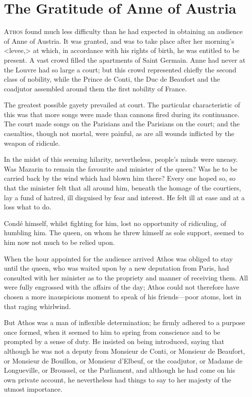 \chapter{The Gratitude of Anne of Austria}

 \lettrine{A}{thos} found much less difficulty than he had expected in obtaining an audience of Anne of Austria. It was granted, and was to take place after her morning's <levee,> at which, in accordance with his rights of birth, he was entitled to be present. A vast crowd filled the apartments of Saint Germain. Anne had never at the Louvre had so large a court; but this crowd represented chiefly the second class of nobility, while the Prince de Conti, the Duc de Beaufort and the coadjutor assembled around them the first nobility of France.

The greatest possible gayety prevailed at court. The particular characteristic of this was that more songs were made than cannons fired during its continuance. The court made songs on the Parisians and the Parisians on the court; and the casualties, though not mortal, were painful, as are all wounds inflicted by the weapon of ridicule.

In the midst of this seeming hilarity, nevertheless, people's minds were uneasy. Was Mazarin to remain the favourite and minister of the queen? Was he to be carried back by the wind which had blown him there? Every one hoped so, so that the minister felt that all around him, beneath the homage of the courtiers, lay a fund of hatred, ill disguised by fear and interest. He felt ill at ease and at a loss what to do.

Condé himself, whilst fighting for him, lost no opportunity of ridiculing, of humbling him. The queen, on whom he threw himself as sole support, seemed to him now not much to be relied upon.

When the hour appointed for the audience arrived Athos was obliged to stay until the queen, who was waited upon by a new deputation from Paris, had consulted with her minister as to the propriety and manner of receiving them. All were fully engrossed with the affairs of the day; Athos could not therefore have chosen a more inauspicious moment to speak of his friends—poor atoms, lost in that raging whirlwind.

But Athos was a man of inflexible determination; he firmly adhered to a purpose once formed, when it seemed to him to spring from conscience and to be prompted by a sense of duty. He insisted on being introduced, saying that although he was not a deputy from Monsieur de Conti, or Monsieur de Beaufort, or Monsieur de Bouillon, or Monsieur d'Elbeuf, or the coadjutor, or Madame de Longueville, or Broussel, or the Parliament, and although he had come on his own private account, he nevertheless had things to say to her majesty of the utmost importance.

